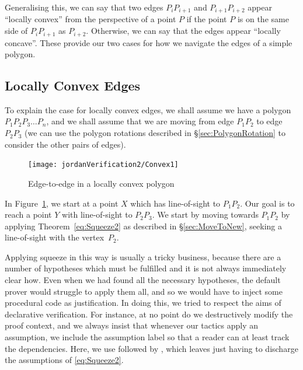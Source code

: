 Generalising this, we can say that two edges $P_{i}P_{i+1}$ and $P_{i+1}P_{i+2}$ appear ``locally convex'' from the perspective of a point $P$ if the point $P$ is on the same side of $P_{i}P_{i+1}$ as $P_{i+2}$. Otherwise, we can say that the edges appear ``locally concave''. These provide our two cases for how we navigate the edges of a simple polygon.

\subsection{Locally Convex Edges}\label{sec:ConcaveMove}
To explain the case for locally convex edges, we shall assume we have a polygon $P_1P_2P_3\ldots P_n$, and we shall assume that we are moving from edge $P_1P_2$ to edge $P_2P_3$ (we can use the polygon rotations described in \S\ref{sec:PolygonRotation} to consider the other pairs of edges).

\begin{figure}
\centering\texttt{[image: jordanVerification2/Convex1]}
\caption{Edge-to-edge in a locally convex polygon}
\label{fig:Convex1}
\end{figure}

In Figure~\ref{fig:Convex1}, we start at a point $X$ which has line-of-sight to $P_1P_2$. Our goal is to reach a point $Y$ with line-of-sight to $P_2P_3$. We start by moving towards $P_1P_2$ by applying Theorem~\ref{eq:Squeeze2} as described in \S\ref{sec:MoveToNew}, seeking a line-of-sight with the vertex~$P_2$. 

\label{sec:InjectingProcedural}Applying squeeze in this way is usually a tricky business, because there are a number of hypotheses which must be fulfilled and it is not always immediately clear how. Even when we had found all the necessary hypotheses, the default  prover would struggle to apply them all, and so we would have to inject some procedural code as justification. In doing this, we tried to respect the aims of declarative verification. For instance, at no point do we destructively modify the proof context, and we always insist that whenever our tactics apply an assumption, we include the assumption label so that a reader can at least track the dependencies. Here, we use  followed by , which leaves  just having to discharge the assumptions of \eqref{eq:Squeeze2}.



